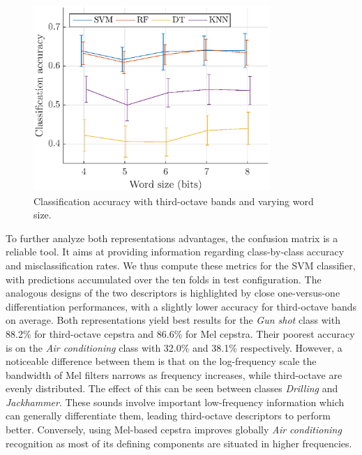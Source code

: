 \documentclass[sensors,article,submit,moreauthors,pdftex,10pt,a4paper]{mdpi}
\providecommand{\DIFdelbegin}{} %
\providecommand{\DIFdelend}{} %
\providecommand{\DIFaddbeginFL}{} %
\providecommand{\DIFaddendFL}{} %
\providecommand{\DIFdelbeginFL}{} %
\providecommand{\DIFdelendFL}{} %
\begin{document}
\begin{figure}[htbp]
	\centering
		\DIFdelbeginFL %
\DIFdelendFL \DIFaddbeginFL \includegraphics[width=0.8\textwidth]{figures/class_tob_q.eps}
	\DIFaddendFL \caption{Classification accuracy with third-octave bands and varying word size.}
	\label{fig:class_tob_q}
\end{figure}

To further analyze both representations advantages, the confusion matrix is a reliable tool. It aims at providing information regarding class-by-class accuracy and misclassification rates. We thus compute these metrics for the SVM classifier, with predictions accumulated over the ten folds in test configuration. The analogous designs of the two descriptors is highlighted by close one-versus-one differentiation performances, with a slightly lower accuracy for third-octave bands on average. Both representations yield best results for the \textit{Gun shot} class with 88.2\% for third-octave cepstra and 86.6\% for Mel cepstra. Their poorest accuracy is on the \textit{Air conditioning} class with 32.0\% and 38.1\% respectively. However, a noticeable difference between them is that on the log-frequency scale the bandwidth of Mel filters narrows as frequency increases, while third-octave are evenly distributed. The effect of this can be seen between classes \textit{Drilling} and \textit{Jackhammer}. These sounds involve important low-frequency information which can generally differentiate them, leading third-octave descriptors to perform better. Conversely, using Mel-based cepstra improves globally \textit{Air conditioning} recognition as most of its defining components are situated in higher frequencies.
\DIFdelbegin %
\DIFdelend 
\end{document}
